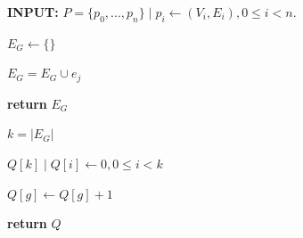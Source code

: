 \begin{figure}[h!]

\begin{algorithmic}[1]













\State \textbf{INPUT: } $P=\{p_0,...,p_n\} \mid p_i\gets (V_i, E_i), 0 \leq i < n.$

\State $E_G \gets \{\}$



\State $E_G = E_G \cup e_j$
\EndIf

\EndFor

\EndFor
\State \textbf{return} $E_G$

\EndProcedure
\end{algorithmic}


\begin{algorithmic}[1]

\State $k = |E_G|$

\State $Q[k] \mid Q[i] \gets 0, 0 \leq i < k$





\State $Q[g] \gets Q[g] + 1$
\EndIf

\EndFor

\EndFor


\State \textbf{return} $Q$

\EndProcedure
\end{algorithmic}


\end{figure}
